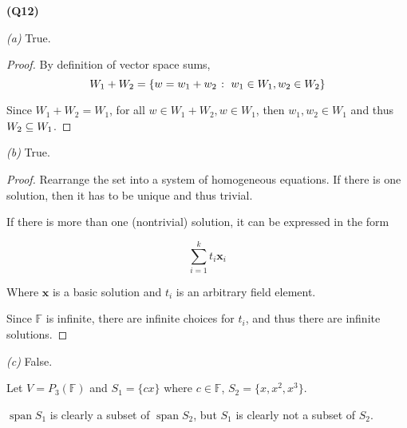 \documentclass[12pt, a4paper]{article}
\newcommand{\F}{\mathbb{F}}
\begin{document}
\textbf{(Q12)}

\textit{(a)} True.

\begin{proof}
    By definition of vector space sums,
    \[
        W_1 + W_2 = \{w = w_1 + w_2 \; \colon \; w_1 \in W_1, w_2 \in W_2\}
    \]

    Since $W_1 + W_2 = W_1$, for all $w \in W_1 + W_2, w \in W_1$, then
    $w_1, w_2 \in W_1$ and thus $W_2 \subseteq W_1$.
\end{proof}

\textit{(b)} True.

\begin{proof}
    Rearrange the set into a system of homogeneous equations. If there
    is one solution, then it has to be unique and thus trivial.

    If there is more than one (nontrivial) solution, it can be expressed in the form

    \[
        \sum_{i = 1}^{k} t_i \mathbf{x}_i
    \]

    Where $\mathbf{x}$ is a basic solution and $t_i$ is an arbitrary
    field element.

    Since $\F$ is infinite, there are infinite choices for $t_i$, and
    thus there are infinite solutions.
\end{proof}

\textit{(c)} False.

Let $V = P_3(\F)$ and $S_1 = \{cx\}$ where $c \in \F$, $S_2 = \{x, x^2, x^3\}$.

$\operatorname{span} S_1$ is clearly a subset of $\operatorname{span} S_2$,
but $S_1$ is clearly not a subset of $S_2$.
\end{document}
